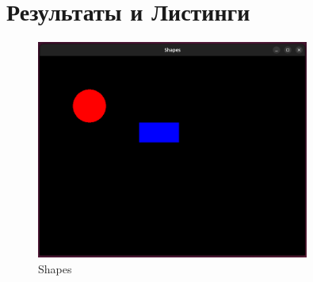 \documentclass[referat]{SCWorks}
\begin{document}
\conclusion






\appendix

\section{Результаты и Листинги}

\begin{figure}[ht]
    \centering
    \includegraphics[width=0.8\textwidth]{src/img/sfml_shapes.png}
    \caption{Shapes}
    \label{fig:shapes}
\end{figure}


\end{document}
